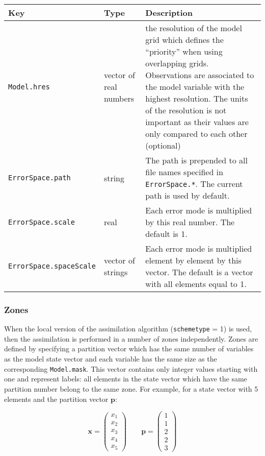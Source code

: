 \documentclass[a4paper,12pt]{article}
\newcommand{\code}{\texttt}
\newenvironment{keytabular}{\begin{tabular}{|p{0.3\textwidth}|p{0.2\textwidth}|p{0.5\textwidth}|} \hline Key & Type & Description \\ \hline \hline }{\end{tabular}}
\begin{document}
\begin{keytabular}
\code{Model.hres} & vector of real numbers & the resolution of the model grid which defines the ``priority'' when using overlapping grids. Observations are associated to the model variable with the highest resolution. The units of the resolution is not important as their values are only compared to each other (optional)
\\
\code{ErrorSpace.path} & string &  The path is prepended to all file names
specified in \code{ErrorSpace.*}. The current path is used by default.
\\
\code{ErrorSpace.scale} & real &
Each error mode is multiplied by this real number. The default is 1.
\\
\code{ErrorSpace.spaceScale} & vector of strings &
Each error mode is multiplied element by element by this vector. The
default is a vector with all elements equal to 1.
\\
\hline
\end{keytabular}

\subsubsection{Zones}

When the local version of the assimilation algorithm (\code{schemetype} = 1) is used, then the assimilation is performed in a number of zones independently. Zones are defined by specifying a partition vector which has the same number of variables as the model state vector and each variable has the same size as the corresponding \code{Model.mask}. This vector contains only integer values starting with one and represent labels: all elements in the state vector which have the same partition number belong to the same zone. For example, for a state vector with 5 elements and the partition vector $\mathbf p$:

\begin{equation}
\mathbf x = 
\left( 
\begin{array}{c}
x_1 \\
x_2 \\
x_3 \\
x_4 \\
x_5
\end{array}
\right) 
\qquad
\mathbf p = 
\left( 
\begin{array}{c}
1 \\
1 \\
2 \\
2 \\
3
\end{array}
\right) 
\end{equation}
\end{document}

